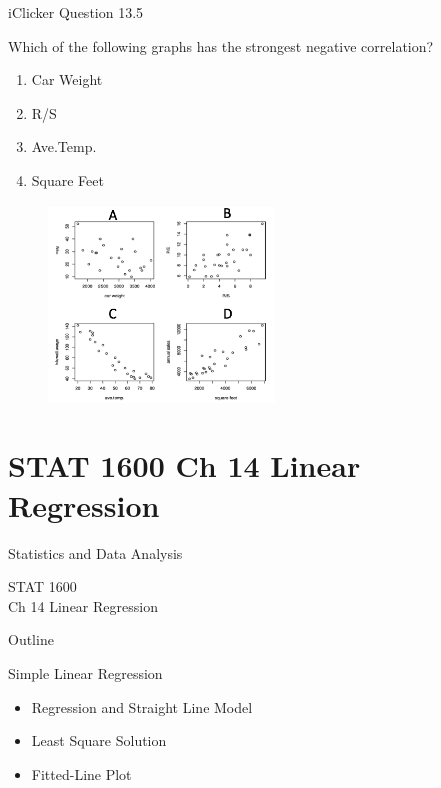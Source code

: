 \documentclass[14pt]{beamer}\usepackage[]{graphicx}\usepackage[]{color}
\begin{document}
\begin{frame}[fragile]{iClicker Question 13.5}

Which of the following graphs has the strongest negative correlation?

\begin{minipage}[ht]{4cm}

\begin{enumerate}[A]
\item Car Weight
\item R/S
\item Ave.Temp.
\item Square Feet
\end{enumerate}
\end{minipage}
\begin{minipage}[ht]{6cm}

\begin{figure}[htbp]
   \centering
   \includegraphics[width=6cm]{chapters/chapter13/figure/fig3.png} %
\end{figure}
\end{minipage}
\end{frame}



\section{STAT 1600 Ch 14 Linear Regression}

\begin{frame}[fragile]{Statistics and Data Analysis}

STAT 1600 \\ Ch 14 Linear Regression

\end{frame}

\begin{frame}[fragile]{Outline}

Simple Linear Regression

\begin{itemize}
\item Regression and Straight Line Model  
\item Least Square Solution
\item Fitted-Line Plot
\end{itemize}
\end{frame}
\end{document}
